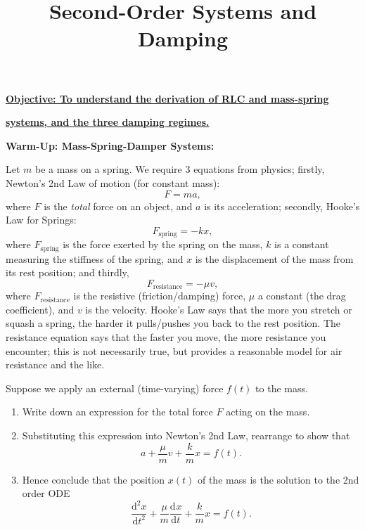 \documentclass{article}
\newcommand{\deriv}[3][]{\frac{\mathrm{d}^{#1}#2}{\mathrm{d}#3^{#1}}}
\begin{document}
\title{Second-Order Systems and Damping}
\date{}

\maketitle
\thispagestyle{empty}

\Large

\textbf{\underline{Objective: To understand the derivation of RLC and mass-spring}}

\textbf{\underline{systems, and the three damping regimes.}}







\vspace{5mm}




\textbf{Warm-Up: Mass-Spring-Damper Systems:}\bigskip


Let $m$ be a mass on a spring. We require 3 equations from physics; firstly, Newton's 2nd Law of motion (for constant mass):
\[F=ma,\]
where $F$ is the \textit{total} force on an object, and $a$ is its acceleration; secondly, Hooke's Law for Springs:
\[F_\mathrm{spring}=-kx,\]
where $F_\mathrm{spring}$ is the force exerted by the spring on the mass, $k$ is a constant measuring the stiffness of the spring, and $x$ is the displacement of the mass from its rest position; and thirdly,
\[F_\mathrm{resistance}=-\mu v,\]
where $F_\mathrm{resistance}$ is the resistive (friction/damping) force, $\mu$ a constant (the drag coefficient), and $v$ is the velocity. Hooke's Law says that the more you stretch or squash a spring, the harder it pulls/pushes you back to the rest position. The resistance equation says that the faster you move, the more resistance you encounter; this is not necessarily true, but provides a reasonable model for air resistance and the like.

Suppose we apply an external (time-varying) force $f(t)$ to the mass.

\begin{enumerate}
	\item Write down an expression for the total force $F$ acting on the mass.
	\item Substituting this expression into Newton's 2nd Law, rearrange to show that
		\[a+\frac{\mu}{m}v+\frac{k}{m}x=f(t).\]
	\item Hence conclude that the position $x(t)$ of the mass is the solution to the 2nd order ODE
		\[\deriv[2]{x}{t}+\frac{\mu}{m}\deriv{x}{t}+\frac{k}{m}x = f(t).\]
\end{enumerate}
\end{document}
